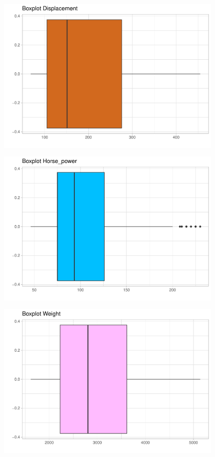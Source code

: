 \begin{figure}[H]\includegraphics[width=.9\linewidth]{img/EDA_files/figure-latex/unnamed-chunk-8-1} \caption{}\end{figure}
\begin{figure}[H]\includegraphics[width=.9\linewidth]{img/EDA_files/figure-latex/unnamed-chunk-8-2} \caption{}\end{figure}
\begin{figure}[H]\includegraphics[width=.9\linewidth]{img/EDA_files/figure-latex/unnamed-chunk-8-3} \caption{}\end{figure}
